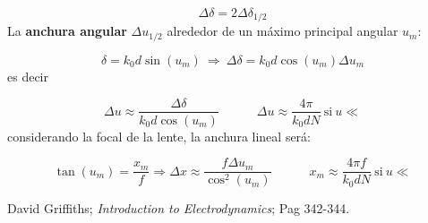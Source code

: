\documentclass[12pt,a4paper]{book}
\numberwithin{equation}{section}
\numberwithin{figure}{section}
\newcommand{\tquad}{\quad \quad \quad}
\newcommand{\1}{_{(1)}}
\newcommand{\2}{_{(2)}}
\theoremstyle{definition}
\begin{document}
\begin{equation}
    \Delta \delta = 2 \Delta \delta_{1/2}
\end{equation}
La \textbf{anchura angular} $\Delta u_{1/2}$ alrededor de un máximo principal angular $u_m$:

\begin{equation}
    \delta = k_0 d \sin (u_m) \ \Rightarrow \ \Delta \delta = k_0 d \cos (u_m) \Delta u_m
\end{equation}
es decir

\begin{equation}
    \Delta u \approx \frac{\Delta \delta}{k_0 d \cos (u_m)}  \tquad \Delta u \approx \frac{4 \pi}{k_0 d N} \ \mathrm{si} \ u \ll
\end{equation}
considerando la focal de la lente, la anchura lineal será:

\begin{equation}
   \tan (u_m) = \frac{x_m}{f} \Rightarrow \Delta x \approx \frac{f\Delta u_m}{\cos^2(u_m)}  \tquad x_m \approx \frac{4 \pi f}{k_0 d N} \ \mathrm{si} \ u \ll
\end{equation}





\begin{thebibliography}{n}
 David Griffiths; 
{\it Introduction to Electrodynamics}; Pag 342-344. 


\end{thebibliography}
\end{document}
